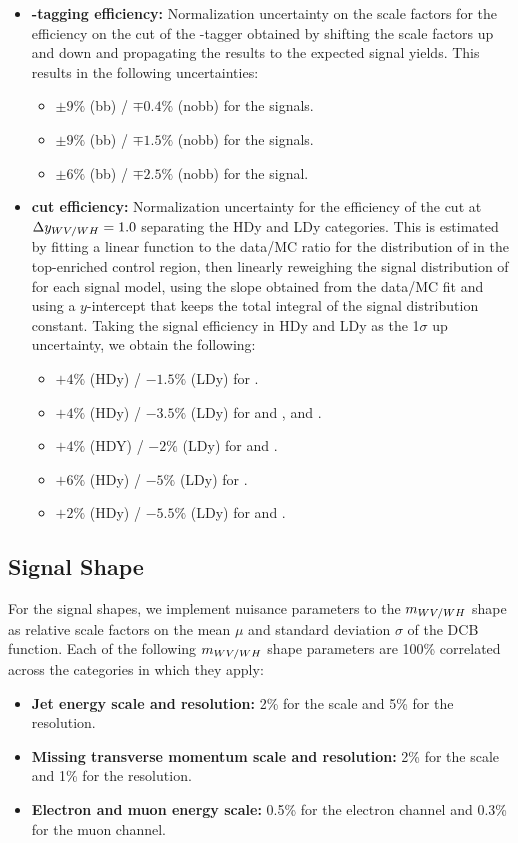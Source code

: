 \begin{itemize}
\begin{itemize}
  \end{itemize}
  \item {\bfseries \bbbar-tagging efficiency:} Normalization uncertainty on the scale factors for the efficiency on the cut of the \bbbar-tagger obtained by shifting the scale factors up and down and propagating the results to the expected signal yields.
  This results in the following uncertainties:
  \begin{itemize}
    \item $\pm9\%$ (bb) / $\mp0.4\%$ (nobb) for the \WW signals.
    \item $\pm9\%$ (bb) / $\mp1.5\%$ (nobb) for the \WZ signals.
    \item $\pm6\%$ (bb) / $\mp2.5\%$ (nobb) for the \WH signal.
  \end{itemize}
  \item {\bfseries \Dy cut efficiency:} Normalization uncertainty for the efficiency of the cut at $\Delta y_{WV/WH}=1.0$ separating the HDy and LDy categories.
  This is estimated by fitting a linear function to the data/MC ratio for the distribution of \Dy in the top-enriched control region, then linearly reweighing the signal distribution of \Dy for each signal model, using the slope obtained from the data/MC fit and using a $y$-intercept that keeps the total integral of the signal distribution constant.
  Taking the signal efficiency in HDy and LDy as the 1$\sigma$ up uncertainty, we obtain the following:
  \begin{itemize}
    \item $+4\%$ (HDy) / $-1.5\%$ (LDy) for \ggF\GBulktoWW.
    \item $+4\%$ (HDy) / $-3.5\%$ (LDy) for \ggF and \VBF\RadtoWW, and \DY\ZprtoWW.
    \item $+4\%$ (HDY) / $-2\%$ (LDy) for \DY\WprtoWZ and \WprtoWH.
    \item $+6\%$ (HDy) / $-5\%$ (LDy) for \VBF\GBulktoWW.
    \item $+2\%$ (HDy) / $-5.5\%$ (LDy) for \VBF\ZprtoWW and \WprtoWZ.
  \end{itemize}
\end{itemize}

\subsection{Signal Shape}

For the signal shapes, we implement nuisance parameters to the $m_{WV/WH}$ shape as relative scale factors on the mean $\mu$ and standard deviation $\sigma$ of the DCB function.
Each of the following $m_{WV/WH}$ shape parameters are 100\% correlated across the categories in which they apply:
\begin{itemize}
  \item {\bfseries Jet energy scale and resolution:} 2\% for the scale and 5\% for the resolution.
  \item {\bfseries Missing transverse momentum scale and resolution:} 2\% for the scale and 1\% for the resolution.
  \item {\bfseries Electron and muon energy scale:} 0.5\% for the electron channel and 0.3\% for the muon channel.
\end{itemize}

